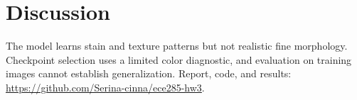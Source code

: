\documentclass{article}
\begin{document}
\section{Discussion}
The model learns stain and texture patterns but not realistic fine morphology. Checkpoint selection uses a limited color diagnostic, and evaluation on training images cannot establish generalization. Report, code, and results:  \url{https://github.com/Serina-cinna/ece285-hw3}.

\small


\end{document}
